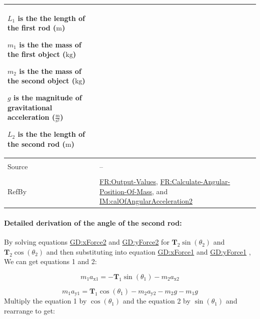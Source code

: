 \documentclass[12pt]{article}
\begin{document}
\begin{minipage}{\textwidth}
\begin{tabular}{>{\raggedright}p{}>{\raggedright\arraybackslash}p{}}
\begin{symbDescription}
              \item{${L_{1}}$ is the the length of the first rod (${\text{m}}$)}
              \item{${m_{1}}$ is the the mass of the first object (${\text{kg}}$)}
              \item{${m_{2}}$ is the the mass of the second object (${\text{kg}}$)}
              \item{$g$ is the magnitude of gravitational acceleration ($\frac{\text{m}}{\text{s}^{2}}$)}
              \item{${L_{2}}$ is the the length of the second rod (${\text{m}}$)}
              \end{symbDescription}
\\ \midrule \\
Source & --
         
\\ \midrule \\
RefBy & \hyperref[outputValues]{FR:Output-Values}, \hyperref[calcAngPos]{FR:Calculate-Angular-Position-Of-Mass}, and \hyperref[IM:calOfAngularAcceleration2]{IM:calOfAngularAcceleration2}
        
\\ \bottomrule
\end{tabular}
\end{minipage}
\paragraph{Detailed derivation of the angle of the second rod:}
\label{IM:calOfAngularAcceleration2Deriv}
By solving equations \hyperref[GD:xForce2]{GD:xForce2} and \hyperref[GD:yForce2]{GD:yForce2} for ${\symbf{T}_{2}} \sin\left({θ_{2}}\right)$ and ${\symbf{T}_{2}} \cos\left({θ_{2}}\right)$ and then substituting into equation \hyperref[GD:xForce1]{GD:xForce1} and \hyperref[GD:yForce1]{GD:yForce1} , We can get equations 1 and 2:

\begin{displaymath}
{m_{1}} {a_{\text{x}1}}=-{\symbf{T}_{1}} \sin\left({θ_{1}}\right)-{m_{2}} {a_{\text{x}2}}
\end{displaymath}

\begin{displaymath}
{m_{1}} {a_{\text{y}1}}={\symbf{T}_{1}} \cos\left({θ_{1}}\right)-{m_{2}} {a_{\text{y}2}}-{m_{2}} g-{m_{1}} g
\end{displaymath}
Multiply the equation 1 by $\cos\left({θ_{1}}\right)$ and the equation 2 by $\sin\left({θ_{1}}\right)$ and rearrange to get:
\end{document}
